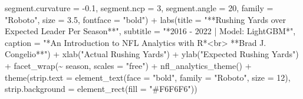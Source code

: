 \documentclass[
  letterpaper,
]{krantz}
\newenvironment{Shaded}{\begin{snugshade}}{\end{snugshade}}
\newcommand{\AttributeTok}[1]{\textcolor[rgb]{0.40,0.45,0.13}{#1}}
\newcommand{\DecValTok}[1]{\textcolor[rgb]{0.68,0.00,0.00}{#1}}
\newcommand{\FloatTok}[1]{\textcolor[rgb]{0.68,0.00,0.00}{#1}}
\newcommand{\FunctionTok}[1]{\textcolor[rgb]{0.28,0.35,0.67}{#1}}
\newcommand{\NormalTok}[1]{\textcolor[rgb]{0.00,0.23,0.31}{#1}}
\newcommand{\SpecialCharTok}[1]{\textcolor[rgb]{0.37,0.37,0.37}{#1}}
\newcommand{\StringTok}[1]{\textcolor[rgb]{0.13,0.47,0.30}{#1}}
\begin{document}
\begin{Shaded}
\begin{Highlighting}[]
                  \AttributeTok{segment.curvature =} \SpecialCharTok{{-}}\FloatTok{0.1}\NormalTok{,}
                  \AttributeTok{segment.ncp =} \DecValTok{3}\NormalTok{, }\AttributeTok{segment.angle =} \DecValTok{20}\NormalTok{,}
                  \AttributeTok{family =} \StringTok{"Roboto"}\NormalTok{, }\AttributeTok{size =} \FloatTok{3.5}\NormalTok{,}
                  \AttributeTok{fontface =} \StringTok{"bold"}\NormalTok{) }\SpecialCharTok{+}
  \FunctionTok{labs}\NormalTok{(}\AttributeTok{title =} \StringTok{"**Rushing Yards over Expected Leader Per Season**"}\NormalTok{,}
       \AttributeTok{subtitle =} \StringTok{"*2016 {-} 2022 | Model: LightGBM*"}\NormalTok{,}
       \AttributeTok{caption =} \StringTok{"*An Introduction to NFL Analytics with R*\textless{}br\textgreater{}}
\StringTok{       **Brad J. Congelio**"}\NormalTok{) }\SpecialCharTok{+}
  \FunctionTok{xlab}\NormalTok{(}\StringTok{"Actual Rushing Yards"}\NormalTok{) }\SpecialCharTok{+}
  \FunctionTok{ylab}\NormalTok{(}\StringTok{"Expected Rushing Yards"}\NormalTok{) }\SpecialCharTok{+}
  \FunctionTok{facet\_wrap}\NormalTok{(}\SpecialCharTok{\textasciitilde{}}\NormalTok{ season, }\AttributeTok{scales =} \StringTok{"free"}\NormalTok{) }\SpecialCharTok{+}
  \FunctionTok{nfl\_analytics\_theme}\NormalTok{() }\SpecialCharTok{+}
  \FunctionTok{theme}\NormalTok{(}\AttributeTok{strip.text =} \FunctionTok{element\_text}\NormalTok{(}\AttributeTok{face =} \StringTok{"bold"}\NormalTok{, }\AttributeTok{family =} \StringTok{"Roboto"}\NormalTok{, }\AttributeTok{size =} \DecValTok{12}\NormalTok{),}
        \AttributeTok{strip.background =} \FunctionTok{element\_rect}\NormalTok{(}\AttributeTok{fill =} \StringTok{"\#F6F6F6"}\NormalTok{))}
\end{Highlighting}
\end{Shaded}
\end{document}
